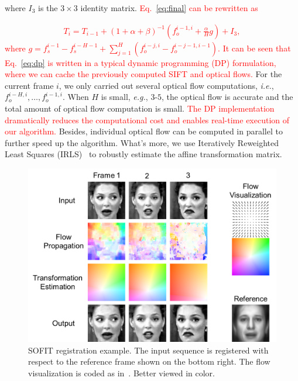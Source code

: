 \documentclass[10pt,journal]{IEEEtran}
\newcommand{\Songfan}[1]{\textcolor{red}{#1}}
\begin{document}
\noindent where $I_3$ is the $3\times 3$ identity matrix. \Songfan{Eq.~\eqref{eq:final} can be rewritten as}

\Songfan{
\begin{align}
\label{eq:dp}
T_i=T_{i-1}+(1+\alpha+\beta)^{-1}(f_o^{i-1,i}+\frac{\alpha}{H}g) + I_3,
\end{align}
}
\Songfan{\noindent where $g=f_s^{i-1}-f_s^{i-H-1}+\sum_{j=1}^H(f_o^{i-j,i}-f_o^{i-j-1,i-1})$. It can be seen that Eq.~\eqref{eq:dp} is written in a typical dynamic programming (DP) formulation, where we can cache the previously computed SIFT and optical flows.} For the current frame $i$, we only carried out several optical flow computations, \textit{i.e.}, $f_o^{i-H,i},\ldots,f_o^{i-1,i}$. When $H$ is small, \textit{e.g.}, $3$-$5$, the optical flow is accurate and the total amount of optical flow computation is small. \Songfan{The DP implementation dramatically reduces the computational cost and enables real-time execution of our algorithm.} Besides, individual optical flow can be computed in parallel to further speed up the algorithm. What's more, we use Iteratively Reweighted Least Squares (IRLS)~\cite{Huber81} to robustly estimate the affine transformation matrix. 

\begin{figure}[htbp]
	\centering
		\includegraphics[width=\columnwidth]{fig/theory_example.png}
	\caption{SOFIT registration example. The input sequence is registered with respect to the reference frame shown on the bottom right. The flow visualization is coded as in~\cite{Baker_ICCV07}. Better viewed in color.}
	\label{fig_theory_example}
\end{figure}
\end{document}
